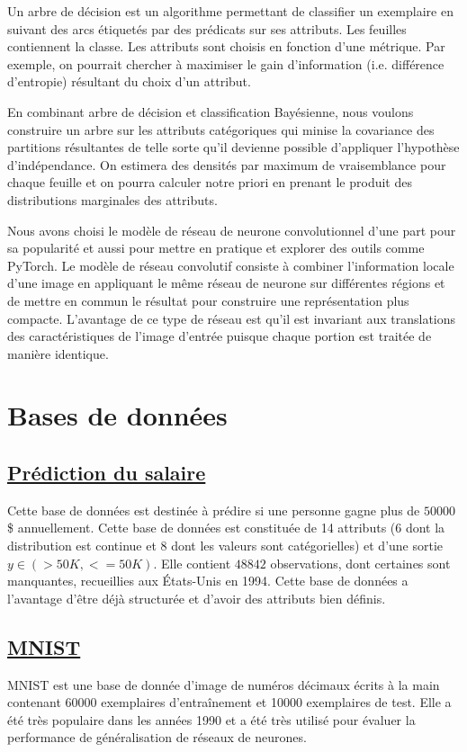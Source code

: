\documentclass[12pt,letterpaper]{article}
\begin{document}
Un arbre de décision est un algorithme permettant de classifier un exemplaire
en suivant des arcs étiquetés par des prédicats sur ses attributs. Les feuilles
contiennent la classe. Les attributs sont choisis en fonction d'une métrique.
Par exemple, on pourrait chercher à maximiser le gain d'information (i.e.
différence d'entropie) résultant du choix d'un attribut.

En combinant arbre de décision et classification Bayésienne, nous voulons
construire un arbre sur les attributs catégoriques qui minise la covariance des
partitions résultantes de telle sorte qu'il devienne possible d'appliquer
l'hypothèse d'indépendance. On estimera des densités par maximum de
vraisemblance pour chaque feuille et on pourra calculer notre priori en prenant
le produit des distributions marginales des attributs.

Nous avons choisi le modèle de réseau de neurone convolutionnel d'une part pour
sa popularité et aussi pour mettre en pratique et explorer des outils comme
PyTorch. Le modèle de réseau convolutif consiste à combiner l'information
locale d'une image en appliquant le même réseau de neurone sur différentes
régions et de mettre en commun le résultat pour construire une représentation
plus compacte.  L'avantage de ce type de réseau est qu'il est invariant aux
translations des caractéristiques de l'image d'entrée puisque chaque portion
est traitée de manière identique.

\section{Bases de données}
\subsection{\href{http://archive.ics.uci.edu/ml/datasets/Adult}{Prédiction du salaire}}

Cette base de données est destinée à prédire si une personne gagne plus
de $50 000$\$ annuellement. Cette base de données est constituée de 14 attributs
(6 dont la distribution est continue et 8 dont les valeurs sont catégorielles)
et d'une sortie $y \in \left( >50K, <=50K \right)$. Elle contient $48 842$
observations, dont certaines sont manquantes, recueillies aux États-Unis en
1994. Cette base de données a l'avantage d'être déjà structurée et d'avoir des
attributs bien définis.

\subsection{\href{http://yann.lecun.com/exdb/mnist/}{MNIST}}

MNIST est une base de donnée d'image de numéros décimaux écrits à la main
contenant 60000 exemplaires d'entraînement et 10000 exemplaires de test. Elle a
été très populaire dans les années 1990 et a été très utilisé pour évaluer la performance de
généralisation de réseaux de neurones.
\end{document}
